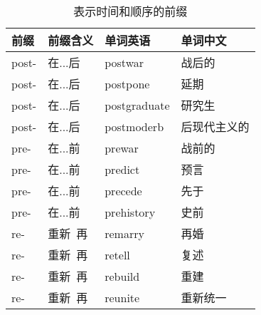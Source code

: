 \documentclass[UTF8]{ctexart}
\begin{document}
    \begin{table}[h!]
        \begin{center}
            \ttfamily
            \begin{tabular}{p{40pt}|p{80pt}|p{80pt}|p{80pt}}
                \hline
                前缀&前缀含义&单词英语&单词中文\\ \hline
                post-&在...后&postwar&战后的\\ \hline
                post-&在...后&postpone&延期\\ \hline
                post-&在...后&postgraduate&研究生\\ \hline
                post-&在...后&postmoderb&后现代主义的\\ \hline
                pre-&在...前&prewar&战前的\\ \hline
                pre-&在...前&predict&预言\\ \hline
                pre-&在...前&precede&先于\\ \hline
                pre-&在...前&prehistory&史前\\ \hline
                re-&重新~再&remarry&再婚\\ \hline
                re-&重新~再&retell&复述\\ \hline
                re-&重新~再&rebuild&重建\\ \hline
                re-&重新~再&reunite&重新统一\\ \hline
            \end{tabular}
            \rmfamily
            \caption{表示时间和顺序的前缀}
        \end{center}
    \end{table}


\newpage
\end{document}
